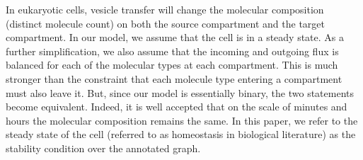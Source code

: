In eukaryotic cells, vesicle transfer will change the molecular composition (distinct molecule count) on both the source compartment and the target compartment. 
%
In our model, we assume that the cell is in a steady state. As a further simplification, we also assume that the incoming and outgoing flux is balanced for each of the molecular types at each compartment.
%
This is much stronger than the constraint that each molecule type entering a compartment must also leave it.
%
But, since our model is essentially binary, the two statements become equivalent. 
%
Indeed, it is well accepted that on the scale of minutes and hours the molecular composition remains the same. 
%
In this paper, we refer to the steady state of the cell (referred to as homeostasis in biological literature) as the stability condition over the annotated graph.



